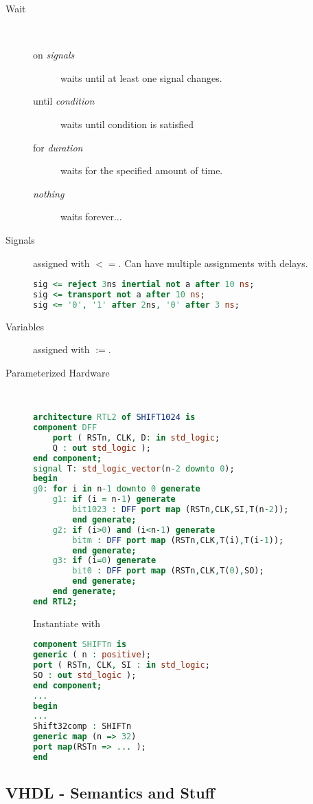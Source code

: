 \begin{description}
	\item[Wait]\ 
	\begin{description}
		\item[on \textit{signals}] waits until at least one signal changes.
		\item[until \textit{condition}] waits until condition is satisfied
		\item[for \textit{duration}] waits for the specified amount of time.
		\item[\textit{nothing}] waits forever...
	\end{description}
	\item[Signals] assigned with $<=$. Can have multiple assignments with
	delays. 
	\begin{lstlisting}[language=vhdl]
sig <= reject 3ns inertial not a after 10 ns;
sig <= transport not a after 10 ns;
sig <= '0', '1' after 2ns, '0' after 3 ns;
	\end{lstlisting}
	\item[Variables] assigned with $:=$.
	\item[Parameterized Hardware]\ 
	\begin{lstlisting}[language=vhdl]
architecture RTL2 of SHIFT1024 is
component DFF
	port ( RSTn, CLK, D: in std_logic;
	Q : out std_logic ); 
end component;
signal T: std_logic_vector(n-2 downto 0);
begin
g0: for i in n-1 downto 0 generate
	g1: if (i = n-1) generate
		bit1023 : DFF port map (RSTn,CLK,SI,T(n-2)); 
		end generate;
	g2: if (i>0) and (i<n-1) generate
		bitm : DFF port map (RSTn,CLK,T(i),T(i-1));
		end generate;
	g3: if (i=0) generate
		bit0 : DFF port map (RSTn,CLK,T(0),SO); 
		end generate;
	end generate; 
end RTL2;
	\end{lstlisting}
	Instantiate with 
	\begin{lstlisting}[language=vhdl]
component SHIFTn is
generic ( n : positive);
port ( RSTn, CLK, SI : in std_logic;
SO : out std_logic ); 
end component;
...
begin
...
Shift32comp : SHIFTn 
generic map (n => 32) 
port map(RSTn => ... );
end
	\end{lstlisting}
\end{description}

\subsection*{VHDL - Semantics and Stuff}

